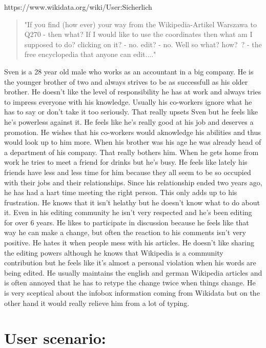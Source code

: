 \documentclass{article}
\begin{document}
\pagebreak

https://www.wikidata.org/wiki/User:Sicherlich
\begin{quote}
"If you find (how ever) your way from the Wikipedia-Artikel Warszawa to Q270 - then what? If I would like to use the coordinates then what am I supposed to do? clicking on it? - no. edit? - no. Well so what? how? ? - the free encyclopedia that anyone can edit...."
\end{quote}

Sven is a 28 year old male who works as an accountant in a big company. He is the younger brother of two and always strives to be as successfull as his older brother. He doesn't like the level of responsibility he has at work and always tries to impress everyone with his knowledge. Usually his co-workers ignore what he has to say or don't take it too seriously. That really upsets Sven but he feels like he's powerless against it. He feels like he's really good at his job and deserves a promotion. He wishes that his co-workers would aknowledge his abilities and thus would look up to him more. When his brother was his age he was already head of a department of his company. That really bothers him. 
When he gets home from work he tries to meet a friend for drinks but he's busy. He feels like lately his friends have less and less time for him because they all seem to be so occupied with their jobs and their relationships. Since his relationship ended two years ago, he has had a hart time meeting the right person. This only adds up to his frustration. He knows that it isn't helathy but he doesn't know what to do about it. Even in his editing community he isn't very respected and he's been editing for over 6 years. He likes to participate in discussion because he feels like that way he can make a change, but often the reaction to his comments isn't very positive. 
He hates it when people mess with his articles. He doesn't like sharing the editing powers although he knows that Wikipedia is a community contribution but he feels like it's almost a personal violation when his words are being edited. He usually maintains the english and german Wikipedia articles and is often annoyed that he has to retype the change twice when things change. He is very sceptical about the infobox information coming from Wikidata but on the other hand it would really relieve him from a lot of typing. 

\section{User scenario:}
\end{document}
